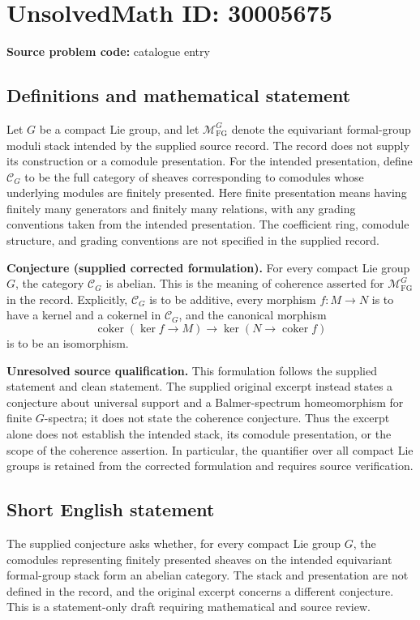 \documentclass[11pt]{article}
\begin{document}
\section*{UnsolvedMath ID: 30005675}
\textbf{Source problem code:} catalogue entry
\subsection{Definitions and mathematical statement}
Let \(G\) be a compact Lie group, and let \(\mathcal M_{\mathrm{FG}}^G\) denote the equivariant formal-group moduli stack intended by the supplied source record. The record does not supply its construction or a comodule presentation. For the intended presentation, define \(\mathcal C_G\) to be the full category of sheaves corresponding to comodules whose underlying modules are finitely presented. Here finite presentation means having finitely many generators and finitely many relations, with any grading conventions taken from the intended presentation. The coefficient ring, comodule structure, and grading conventions are not specified in the supplied record.

\textbf{Conjecture (supplied corrected formulation).} For every compact Lie group \(G\), the category \(\mathcal C_G\) is abelian. This is the meaning of coherence asserted for \(\mathcal M_{\mathrm{FG}}^G\) in the record. Explicitly, \(\mathcal C_G\) is to be additive, every morphism \(f\colon M\to N\) is to have a kernel and a cokernel in \(\mathcal C_G\), and the canonical morphism
\[
\operatorname{coker}(\ker f\longrightarrow M)
\longrightarrow
\ker(N\longrightarrow\operatorname{coker}f)
\]
is to be an isomorphism.

\textbf{Unresolved source qualification.} This formulation follows the supplied statement and clean statement. The supplied original excerpt instead states a conjecture about universal support and a Balmer-spectrum homeomorphism for finite \(G\)-spectra; it does not state the coherence conjecture. Thus the excerpt alone does not establish the intended stack, its comodule presentation, or the scope of the coherence assertion. In particular, the quantifier over all compact Lie groups is retained from the corrected formulation and requires source verification.
\subsection{Short English statement}
The supplied conjecture asks whether, for every compact Lie group \(G\), the comodules representing finitely presented sheaves on the intended equivariant formal-group stack form an abelian category. The stack and presentation are not defined in the record, and the original excerpt concerns a different conjecture. This is a statement-only draft requiring mathematical and source review.
\end{document}
